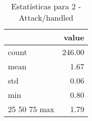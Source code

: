 \begin{table}[htbp]
\caption{Estatísticas para 2 - Attack/handled}
\label{tab:2_-_attack_handled_summary}
\begin{tabular}{lr}
\toprule
 & value \\
\midrule
count & 246.00 \\
mean & 1.67 \\
std & 0.06 \\
min & 0.80 \\
25%
50%
75%
max & 1.79 \\
\bottomrule
\end{tabular}
\end{table}
